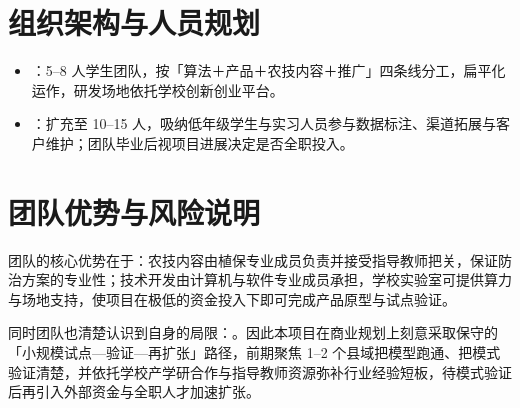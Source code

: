 \section{组织架构与人员规划}

\begin{itemize}[leftmargin=1.6em]
  \item {}：5--8 人学生团队，按「算法＋产品＋农技内容＋推广」四条线分工，扁平化运作，研发场地依托学校创新创业平台。
  \item {}：扩充至 10--15 人，吸纳低年级学生与实习人员参与数据标注、渠道拓展与客户维护；团队毕业后视项目进展决定是否全职投入。
\end{itemize}

\section{团队优势与风险说明}

团队的核心优势在于：农技内容由植保专业成员负责并接受指导教师把关，保证防治方案的专业性；技术开发由计算机与软件专业成员承担，学校实验室可提供算力与场地支持，使项目在极低的资金投入下即可完成产品原型与试点验证。

同时团队也清楚认识到自身的局限：。因此本项目在商业规划上刻意采取保守的「小规模试点—验证—再扩张」路径，前期聚焦 1--2 个县域把模型跑通、把模式验证清楚，并依托学校产学研合作与指导教师资源弥补行业经验短板，待模式验证后再引入外部资金与全职人才加速扩张。
